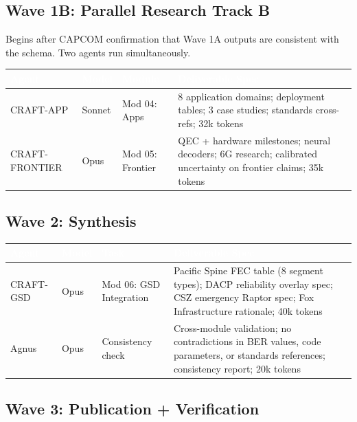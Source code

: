 \documentclass[11pt,letterpaper]{article}
\newcommand{\tableheader}[1]{\textbf{\sffamily\textcolor{white}{#1}}}
\begin{document}
\subsection{Wave 1B: Parallel Research Track B}

Begins after CAPCOM confirmation that Wave 1A outputs are consistent with the schema. Two agents run simultaneously.

\begin{center}
\begin{tabularx}{\textwidth}{L{2.5cm}C{2cm}L{3cm}X}
\toprule
{}
\tableheader{Agent} & \tableheader{Model} & \tableheader{Module} & \tableheader{Deliverable Spec} \\
\midrule
CRAFT-APP & Sonnet & Mod 04: Apps & 8 application domains; deployment tables; 3 case studies; standards cross-refs; 32k tokens \\
CRAFT-FRONTIER & Opus & Mod 05: Frontier & QEC + hardware milestones; neural decoders; 6G research; calibrated uncertainty on frontier claims; 35k tokens \\
\bottomrule
\end{tabularx}
\end{center}

\subsection{Wave 2: Synthesis}

\begin{center}
\begin{tabularx}{\textwidth}{L{2.5cm}C{2cm}L{3cm}X}
\toprule
{}
\tableheader{Agent} & \tableheader{Model} & \tableheader{Task} & \tableheader{Deliverable Spec} \\
\midrule
CRAFT-GSD & Opus & Mod 06: GSD Integration & Pacific Spine FEC table (8 segment types); DACP reliability overlay spec; CSZ emergency Raptor spec; Fox Infrastructure rationale; 40k tokens \\
Agnus & Opus & Consistency check & Cross-module validation; no contradictions in BER values, code parameters, or standards references; consistency report; 20k tokens \\
\bottomrule
\end{tabularx}
\end{center}

\subsection{Wave 3: Publication + Verification}
\end{document}
